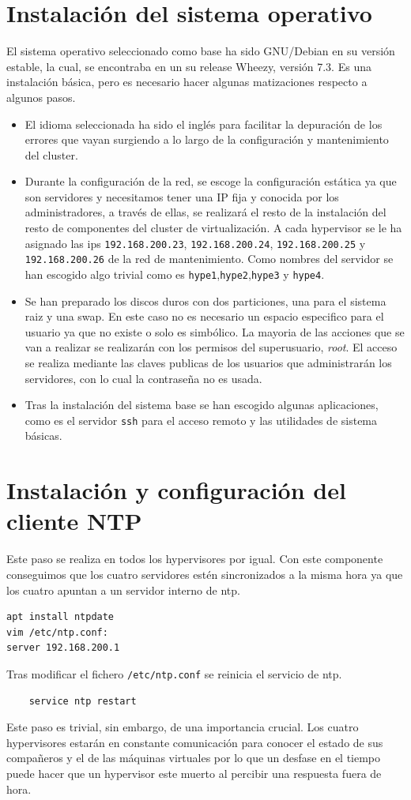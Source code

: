 \documentclass[12pt,a4paper,titlepage,twoside]{report}
\begin{document}
\section{Instalación del sistema operativo}
El sistema operativo seleccionado como base ha sido GNU/Debian en su versión estable, la cual, se encontraba en un su release Wheezy, versión 7.3. Es una instalación básica, pero es necesario hacer algunas matizaciones respecto a algunos pasos.
\begin{itemize}
	\item El idioma seleccionada ha sido el inglés para facilitar la depuración de los errores que vayan surgiendo a lo largo de la configuración y mantenimiento del cluster.
	\item Durante la configuración de la red, se escoge la configuración estática ya que son servidores y necesitamos tener una IP fija y conocida por los administradores, a través de ellas, se realizará el resto de la instalación del resto de componentes del cluster de virtualización. A cada hypervisor se le ha asignado las ips \verb|192.168.200.23|, \verb|192.168.200.24|, \verb|192.168.200.25| y \verb|192.168.200.26| de la red de mantenimiento. Como nombres del servidor se han escogido algo trivial como es \verb|hype1|,\verb|hype2|,\verb|hype3| y \verb|hype4|.
	\item Se han preparado los discos duros con dos particiones, una para el sistema raiz y una swap. En este caso no es necesario un espacio especifico para el usuario ya que no existe o solo es simbólico. La mayoria de las acciones que se van a realizar se realizarán con los permisos del superusuario, \textit{root}. El acceso se realiza mediante las claves publicas de los usuarios que administrarán los servidores, con lo cual la contraseña no es usada.
	\item Tras la instalación del sistema base se han escogido algunas aplicaciones, como es el servidor \verb|ssh| para el acceso remoto y las utilidades de sistema básicas.
\end{itemize}
\section{Instalación y configuración del cliente NTP}
Este paso se realiza en todos los hypervisores por igual. Con este componente conseguimos que los cuatro servidores estén sincronizados a la misma hora ya que los cuatro apuntan a un servidor interno de ntp.
\begin{verbatim}
apt install ntpdate
vim /etc/ntp.conf:
server 192.168.200.1
\end{verbatim}
\par Tras modificar el fichero \verb|/etc/ntp.conf| se reinicia el servicio de ntp.
\begin{verbatim}
	service ntp restart
\end{verbatim}
\par Este paso es trivial, sin embargo, de una importancia crucial. Los cuatro hypervisores estarán en constante comunicación para conocer el estado de sus compañeros y el de las máquinas virtuales por lo que un desfase en el tiempo puede hacer que un hypervisor este muerto al percibir una respuesta fuera de hora.
\end{document}
